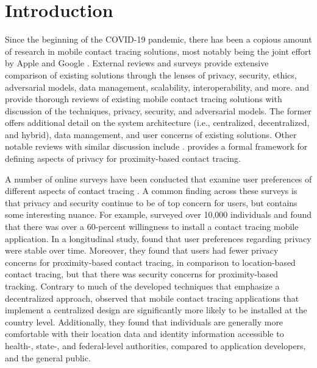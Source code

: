 \chapter{Introduction}


Since the beginning of the COVID-19 pandemic, there has been a copious amount of research in mobile contact tracing solutions, most notably being the joint effort by Apple and Google \citep{AppleGoogle}. External reviews and surveys provide extensive comparison of existing solutions through the lenses of privacy, security, ethics, adversarial models, data management, scalability, interoperability, and more. \citet{Ahmed2020} and \citet{Martin2020} provide thorough reviews of existing mobile contact tracing solutions with discussion of the techniques, privacy, security, and adversarial models. The former offers additional detail on the system architecture (i.e., centralized, decentralized, and hybrid), data management, and user concerns of existing solutions. Other notable reviews with similar discussion include \citet{Wen2020, Raskar2020, Cho2020, Dar2020, Lucivero2020}. \citet{Kuhn2021} provides a formal framework for defining aspects of privacy for proximity-based contact tracing.

A number of online surveys have been conducted that examine user preferences of different aspects of contact tracing \cite{Simko2020, Altmann2020, Li2020}. A common finding across these surveys is that privacy and security continue to be of top concern for users, but contains some interesting nuance. For example, \citet{Altmann2020} surveyed over 10,000 individuals and found that there was over a 60-percent willingness to install a contact tracing mobile application. In a longitudinal study, \citet{Simko2020} found that user preferences regarding privacy were stable over time. Moreover, they found that users had fewer privacy concerns for proximity-based contact tracing, in comparison to location-based contact tracing, but that there was security concerns for proximity-based tracking. Contrary to much of the developed techniques that emphasize a decentralized approach, \citet{Li2020} observed that mobile contact tracing applications that implement a centralized design are significantly more likely to be installed at the country level. Additionally, they found that individuals are generally more comfortable with their location data and identity information accessible to health-, state-, and federal-level authorities, compared to application developers, and the general public.

